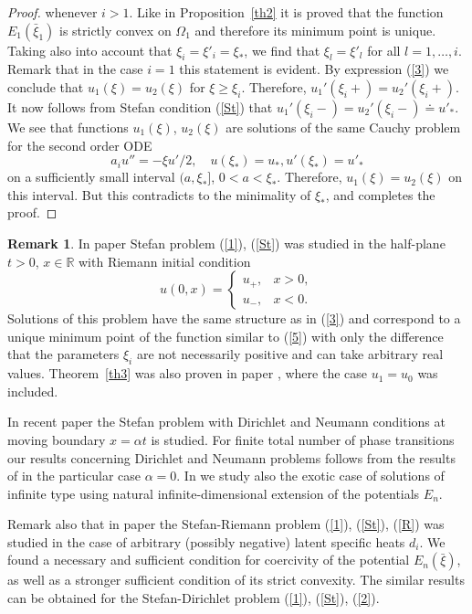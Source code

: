 \documentclass[12pt]{article}
\theoremstyle{plain}
\theoremstyle{definition}
\newtheorem{remark}{Remark}[section]
\numberwithin{equation}{section}
\newcommand{\R}{{\mathbb R}}
\begin{document}
\begin{proof}
whenever $i>1$. Like in Proposition~\ref{th2} it is proved that the function $E_1(\bar\xi_1)$ is strictly convex on $\Omega_1$ and therefore its minimum point is unique. Taking also into account that $\xi_i=\xi'_i=\xi_*$, we find that $\xi_l=\xi'_l$ for all $l=1,\ldots,i$. Remark that in the case $i=1$ this statement is evident. By expression (\ref{3}) we conclude that $u_1(\xi)=u_2(\xi)$ for
$\xi\ge\xi_i$. Therefore, $u_1'(\xi_i+)=u_2'(\xi_i+)$. It now follows from Stefan condition (\ref{St}) that $u_1'(\xi_i-)=u_2'(\xi_i-)\doteq u'_*$. We see that functions $u_1(\xi)$, $u_2(\xi)$ are solutions of the same Cauchy problem for the second order ODE
\[a_iu''=-\xi u'/2, \quad u(\xi_*)=u_*, u'(\xi_*)=u'_*
\]
on a sufficiently small interval $(a,\xi_*]$, $0<a<\xi_*$. Therefore, $u_1(\xi)=u_2(\xi)$ on this interval. But this contradicts to the minimality of $\xi_*$, and completes the proof.
\end{proof}


\begin{remark}\label{rem2} In paper \cite{Pan2} Stefan problem (\ref{1}), (\ref{St}) was studied in the half-plane $t>0$, $x\in\R$ with Riemann initial condition
\begin{equation}
\label{R}
u(0,x)=\left\{\begin{array}{lr} u_+, & x>0, \\ u_-, & x<0. \end{array}\right.
\end{equation}
Solutions of this problem have the same structure as in (\ref{3}) and correspond to a unique minimum point of the function similar to (\ref{5}) with only the difference that the parameters $\xi_i$ are not necessarily positive and can take arbitrary real values. Theorem~\ref{th3} was also proven in paper \cite{Pan3}, where the case $u_1=u_0$ was included.

 In recent paper \cite{Pan4} the Stefan problem with Dirichlet and Neumann conditions at moving boundary $x=\alpha t$ is studied. For finite total number of phase transitions
our results concerning Dirichlet and Neumann problems follows from the results of \cite{Pan4} in the particular case $\alpha=0$. In \cite{Pan4} we study also the exotic case of solutions of infinite type using natural infinite-dimensional extension of the potentials $E_n$.

Remark also that in paper \cite{Pan1} the Stefan-Riemann problem (\ref{1}), (\ref{St}), (\ref{R}) was studied in the case of arbitrary (possibly negative) latent specific heats $d_i$. We found a necessary and sufficient condition for coercivity of the potential $E_n(\bar\xi)$, as well as a stronger sufficient condition of its strict convexity. The similar results can be obtained for the Stefan-Dirichlet problem (\ref{1}), (\ref{St}), (\ref{2}).
\end{remark}
\end{document}
